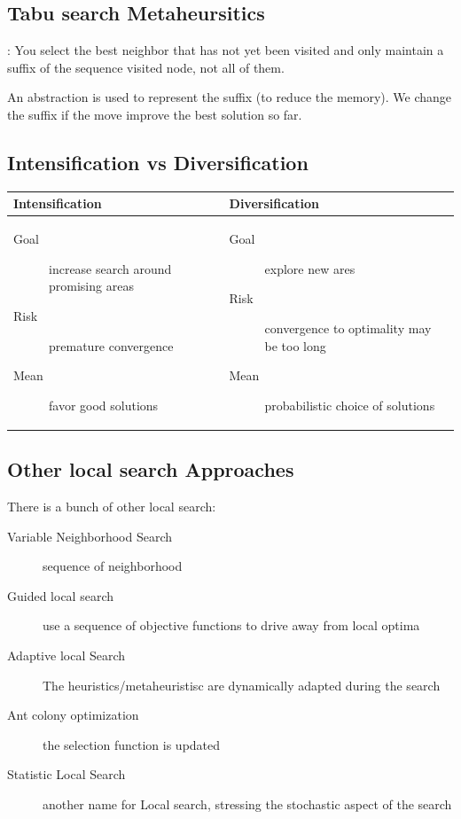 \subsection{Tabu search Metaheursitics}:
You select  the best  neighbor that  has not yet  been visited  and only
maintain a suffix of the sequence visited node, not all of them.

An abstraction is used to represent the suffix (to reduce the memory). We change the suffix
if the move improve the best solution so far.

\subsection{Intensification vs Diversification}
\begin{tabular}{m{8cm}|m{8cm}}
Intensification & Diversification \\
\hline

	\begin{description}
		\item[Goal] increase search around promising areas
		\item[Risk] premature convergence
		\item[Mean] favor good solutions
	\end{description}
&
	\begin{description}
		\item[Goal] explore new ares
		\item[Risk] convergence to optimality may be too long
		\item[Mean] probabilistic choice of solutions
	\end{description}
\end{tabular}

\subsection{Other local search Approaches}

There is a bunch of other local search:
\begin{description}
    \item[Variable Neighborhood Search] sequence of neighborhood
    \item[Guided local search] use a sequence of objective functions to drive away from local optima
    \item[Adaptive local Search] The heuristics/metaheuristisc are dynamically adapted during the search
    \item[Ant colony optimization] the selection function is updated
    \item[Statistic Local Search] another name for Local search, stressing the stochastic aspect of the search
\end{description}




